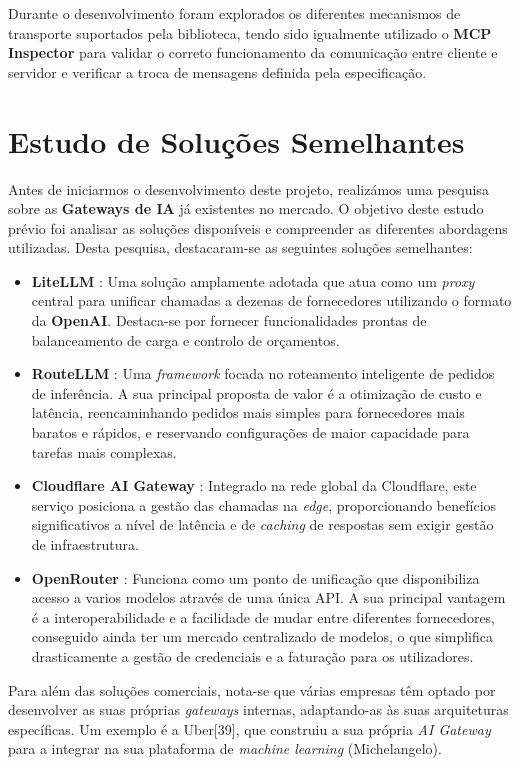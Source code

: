 Durante o desenvolvimento foram explorados os diferentes mecanismos de transporte
suportados pela biblioteca, tendo sido igualmente utilizado o \textbf{MCP Inspector}
\cite{mcp_inspector}
para validar o correto funcionamento da comunicação entre cliente e servidor e
verificar a troca de mensagens definida pela especificação.

\section{Estudo de Soluções Semelhantes}

Antes de iniciarmos o desenvolvimento deste projeto, realizámos uma pesquisa sobre as \textbf{Gateways de IA} já existentes no mercado. O objetivo deste estudo prévio foi analisar as soluções disponíveis e compreender as diferentes abordagens utilizadas.
Desta pesquisa, destacaram-se as seguintes soluções semelhantes:

\begin{itemize}
    \item \textbf{LiteLLM} \cite{litellm}: Uma solução amplamente adotada que atua como um \textit{proxy} central para unificar chamadas a dezenas de fornecedores utilizando o formato da \textbf{OpenAI}. Destaca-se por fornecer funcionalidades prontas de balanceamento de carga e controlo de orçamentos.
    \item \textbf{RouteLLM} \cite{routellm}: Uma \textit{framework} focada no roteamento inteligente de pedidos de inferência. A sua principal proposta de valor é a otimização de custo e latência, reencaminhando pedidos mais simples para fornecedores mais baratos e rápidos, e reservando configurações de maior capacidade para tarefas mais complexas.
    \item \textbf{Cloudflare AI Gateway} \cite{cloudflare_ai_gateway}: Integrado na rede global da Cloudflare, este serviço posiciona a gestão das chamadas na \textit{edge}, proporcionando benefícios significativos a nível de latência e de \textit{caching} de respostas sem exigir gestão de infraestrutura.
    \item \textbf{OpenRouter} \cite{openrouter}: Funciona como um ponto de unificação que disponibiliza acesso a varios modelos através de uma única API. A sua principal vantagem é a interoperabilidade e a facilidade de mudar entre diferentes fornecedores, conseguido ainda ter um mercado centralizado de modelos, o que simplifica drasticamente a gestão de credenciais e a faturação para os utilizadores.
\end{itemize}

Para além das soluções comerciais, nota-se que várias empresas têm optado por desenvolver as suas próprias \textit{gateways} internas, adaptando-as às suas arquiteturas específicas. Um exemplo é a Uber[39], que construiu a sua própria \textit{AI Gateway} para a integrar na sua plataforma de \textit{machine learning} (Michelangelo).

